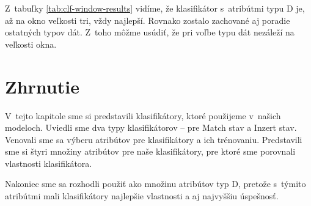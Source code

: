 Z~tabuľky \ref{tab:clf-window-results} vidíme, že klasifikátor s~atribútmi typu D je, až na okno veľkosti tri, vždy najlepší. Rovnako zostalo zachované aj poradie ostatných typov dát. Z~toho môžme usúdiť, že pri voľbe typu dát nezáleží na veľkosti okna.

\section{Zhrnutie}

V~tejto kapitole sme si predstavili klasifikátory, ktoré použijeme v~našich modeloch. Uviedli sme dva typy klasifikátorov -- pre Match stav a Inzert stav. Venovali sme sa výberu atribútov pre klasifikátory a ich trénovaniu. Predstavili sme si štyri množiny atribútov pre naše klasifikátory, pre ktoré sme porovnali vlastnosti klasifikátora.

Nakoniec sme sa rozhodli použiť ako množinu atribútov typ D, pretože s~týmito atribútmi mali klasifikátory najlepšie vlastnosti a aj najvyššiu úspešnosť.
